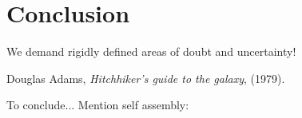 \documentclass[11pt,twoside]{report}
\def\includebibliography{}
\begin{document}
\chapter{Conclusion}
\epigraph{We demand rigidly defined areas of doubt and uncertainty!}{Douglas Adams, \emph{Hitchhiker's guide to the galaxy}, (1979).}

To conclude...
Mention self assembly: \cite{TeichNC2019}

\ifdefined\includebibliography
  \printbibliography
\fi
\end{document}
